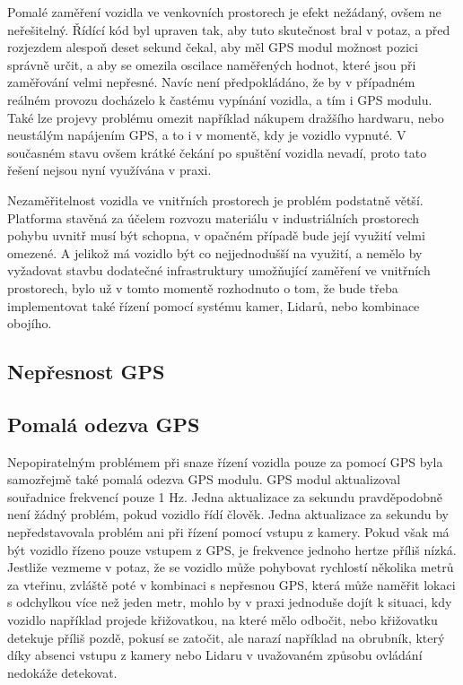 \documentclass[czech, bachelor]{diploma}
\begin{document}
Pomalé zaměření vozidla ve venkovních prostorech je efekt nežádaný, ovšem ne neřešitelný. Řídící kód byl upraven tak, aby tuto
skutečnost bral v potaz, a před rozjezdem alespoň deset sekund čekal, aby měl GPS modul možnost pozici správně určit, a aby se
omezila oscilace naměřených hodnot, které jsou při zaměřování velmi nepřesné. Navíc není předpokládáno, že by v případném reálném
provozu docházelo k častému vypínání vozidla, a tím i GPS modulu. Také lze projevy problému omezit například nákupem dražšího
hardwaru, nebo neustálým napájením GPS, a to i v momentě, kdy je vozidlo vypnuté. V současném stavu ovšem krátké čekání
po spuštění vozidla nevadí, proto tato řešení nejsou nyní využívána v praxi.

Nezaměřitelnost vozidla ve vnitřních prostorech je problém podstatně větší. Platforma stavěná za účelem rozvozu materiálu
v industriálních prostorech pohybu uvnitř musí být schopna, v opačném případě bude její využití velmi omezené. A jelikož má
vozidlo být co nejjednodušší na využití, a nemělo by vyžadovat stavbu dodatečné infrastruktury umožňující zaměření ve vnitřních
prostorech, bylo už v tomto momentě rozhodnuto o tom, že bude třeba implementovat také řízení pomocí systému kamer, Lidarů, nebo
kombinace obojího.

\subsection{Nepřesnost GPS} \label{gps-inaccuracy}


\subsection{Pomalá odezva GPS}

Nepopiratelným problémem při snaze řízení vozidla pouze za pomocí GPS byla samozřejmě také pomalá odezva GPS modulu. GPS modul
aktualizoval souřadnice frekvencí pouze 1 Hz. Jedna aktualizace za sekundu pravděpodobně není žádný problém, pokud vozidlo řídí
člověk. Jedna aktualizace za sekundu by nepředstavovala problém ani při řízení pomocí vstupu z kamery. Pokud však má být vozidlo
řízeno pouze vstupem z GPS, je frekvence jednoho hertze příliš nízká. Jestliže vezmeme v potaz, že se vozidlo může pohybovat 
rychlostí několika metrů za vteřinu, zvláště poté v kombinaci s nepřesnou GPS, která může naměřit lokaci s odchylkou více než 
jeden metr, mohlo by v praxi jednoduše dojít k situaci, kdy vozidlo například projede křižovatkou, na které mělo odbočit, nebo
křižovatku detekuje příliš pozdě, pokusí se zatočit, ale narazí například na obrubník, který díky absenci vstupu z kamery nebo 
Lidaru v uvažovaném způsobu ovládání nedokáže detekovat.
\end{document}
